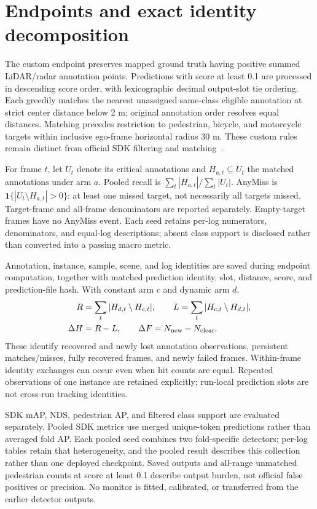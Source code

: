 \section{Endpoints and exact identity decomposition}
The custom endpoint preserves mapped ground truth having positive summed LiDAR/radar annotation points. Predictions with score at least 0.1 are processed in descending score order, with lexicographic decimal output-slot tie ordering. Each greedily matches the nearest unassigned same-class eligible annotation at strict center distance below 2 m; original annotation order resolves equal distances. Matching precedes restriction to pedestrian, bicycle, and motorcycle targets within inclusive ego-frame horizontal radius 30 m. These custom rules remain distinct from official SDK filtering and matching~\cite{nuScenesSDK}.

For frame $t$, let $U_t$ denote its critical annotations and $H_{a,t}\subseteq U_t$ the matched annotations under arm $a$. Pooled recall is $\sum_t|H_{a,t}|/\sum_t|U_t|$. AnyMiss is $\mathbf{1}\{|U_t\setminus H_{a,t}|>0\}$: at least one missed target, not necessarily all targets missed. Target-frame and all-frame denominators are reported separately. Empty-target frames have no AnyMiss event. Each seed retains per-log numerators, denominators, and equal-log descriptions; absent class support is disclosed rather than converted into a passing macro metric.

Annotation, instance, sample, scene, and log identities are saved during endpoint computation, together with matched prediction identity, slot, distance, score, and prediction-file hash. With constant arm $c$ and dynamic arm $d$,
\begin{align}
 R&=\sum_t|H_{d,t}\setminus H_{c,t}|,\qquad
 L=\sum_t|H_{c,t}\setminus H_{d,t}|,\\
 \Delta H&=R-L,\qquad \Delta F=N_{\rm new}-N_{\rm clear}.
\end{align}
These identify recovered and newly lost annotation observations, persistent matches/misses, fully recovered frames, and newly failed frames. Within-frame identity exchanges can occur even when hit counts are equal. Repeated observations of one instance are retained explicitly; run-local prediction slots are not cross-run tracking identities.

SDK mAP, NDS, pedestrian AP, and filtered class support are evaluated separately. Pooled SDK metrics use merged unique-token predictions rather than averaged fold AP. Each pooled seed combines two fold-specific detectors; per-log tables retain that heterogeneity, and the pooled result describes this collection rather than one deployed checkpoint. Saved outputs and all-range unmatched pedestrian counts at score at least 0.1 describe output burden, not official false positives or precision. No monitor is fitted, calibrated, or transferred from the earlier detector outputs.

